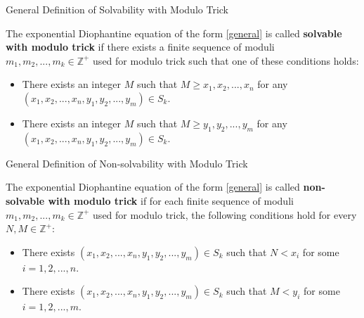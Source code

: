 \begin{frame}{General Definition of Solvability with Modulo Trick}

    \begin{definition}
        The exponential Diophantine equation of the form \eqref{general} is called \textbf{solvable with modulo trick} if there exists a finite sequence of moduli $m_1, m_2, ..., m_k \in \mathbb{Z}^{+}$ used for modulo trick such that one of these conditions holds:
        
        \begin{itemize}
            \item There exists an integer $M$ such that $M \geq x_1, x_2, ..., x_n$ for any $(x_1, x_2, ..., x_n, y_1, y_2, ..., y_m) \in S_k$.
            
            \item There exists an integer $M$ such that $M \geq y_1, y_2, ..., y_m$ for any $(x_1, x_2, ..., x_n, y_1, y_2, ..., y_m) \in S_k$.
        \end{itemize}
    \end{definition}
    
     
\end{frame}

\begin{frame}{General Definition of Non-solvability with Modulo Trick}
 
    \begin{definition}
        The exponential Diophantine equation of the form \eqref{general} is called \textbf{non-solvable with modulo trick} if for each finite sequence of moduli $m_1, m_2, ..., m_k \in \mathbb{Z}^{+}$ used for modulo trick, the following conditions hold for every $N, M \in \mathbb{Z}^{+}$:
        
        \begin{itemize}
            \item There exists $(x_1, x_2, ..., x_n, y_1, y_2, ..., y_m) \in S_k$ such that $N < x_i$ for some $i = 1,2,...,n$.
            
            \item There exists $(x_1, x_2, ..., x_n, y_1, y_2, ..., y_m) \in S_k$ such that $M < y_i$ for some $i = 1,2,...,m$.
        \end{itemize}
    \end{definition}
    
     
\end{frame}


